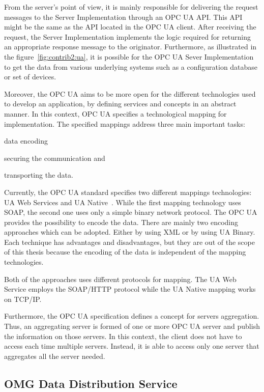 From the server's point of view, it is mainly responsible for delivering the request messages to the Server Implementation through an OPC UA API. This API might be the same as the API located in the OPC UA client. After receiving the request, the Server Implementation implements the logic required for returning an appropriate response message to the originator. Furthermore, as illustrated in the figure~\ref{fig:contrib2:ua}, it is possible for the OPC UA Sever Implementation to get the data from various underlying systems such as a configuration database or set of devices.\par 
Moreover, the OPC UA  aims to be more open for the different technologies used to develop an application, by defining services and concepts in an abstract manner. In this context, OPC UA specifies a technological mapping for implementation. The specified mappings address three main important tasks:
\begin{inlinelist}
  \item data encoding
  \item securing the communication and
  \item transporting the data.~\cite{bookua}
\end{inlinelist}
Currently, the OPC UA standard specifies two different mappings technologies: UA Web Services and UA Native~\cite{ua2}. While the first mapping technology uses SOAP, the second one uses only a simple binary network protocol. The OPC UA provides the possibility to encode the data. There are mainly two encoding approaches which can be adopted. Either by using XML or by using UA Binary. Each technique has advantages and disadvantages, but they are out of the scope of this thesis because the encoding of the data is independent of the mapping technologies.  \par 
Both of the approaches uses different protocols for mapping. The UA Web Service employs the SOAP/HTTP protocol while the UA Native mapping works on TCP/IP.  \par 
Furthermore, the OPC UA specification defines a concept for servers aggregation. Thus, an aggregating server is formed of one or more OPC UA server and publish the information on those servers. In this context, the client does not have to access each time multiple servers. Instead, it is able to access only one server that aggregates all the server needed.

\subsection{OMG Data Distribution Service}

